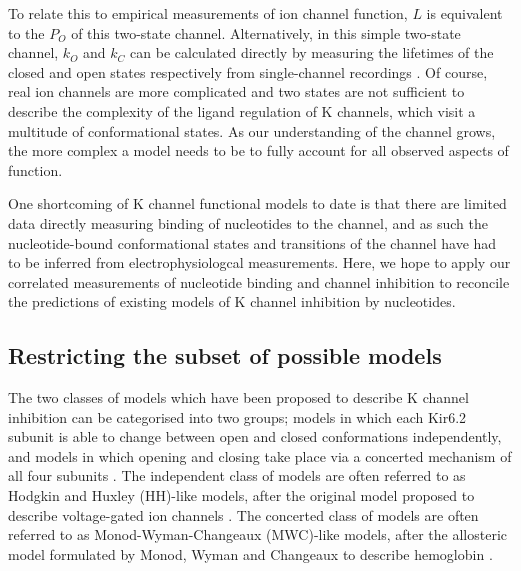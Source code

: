 To relate this to empirical measurements of ion channel function, $L$ is equivalent to the $P_O$ of this two-state channel.
Alternatively, in this simple two-state channel, $k_O$ and $k_C$ can be calculated directly by measuring the lifetimes of the closed and open states respectively from single-channel recordings \cite{reinhold_penner_auth_single-channel_1995, sivilotti_praise_2016}.
Of course, real ion channels are more complicated and two states are not sufficient to describe the complexity of the ligand regulation of K\ATP{} channels, which visit a multitude of conformational states.
As our understanding of the channel grows, the more complex a model needs to be to fully account for all observed aspects of function.

One shortcoming of K\ATP{} channel functional models to date is that there are limited data directly measuring binding of nucleotides to the channel, and as such the nucleotide-bound conformational states and transitions of the channel have had to be inferred from electrophysiologcal measurements.
Here, we hope to apply our correlated measurements of nucleotide binding and channel inhibition to reconcile the predictions of existing models of K\ATP{} channel inhibition by nucleotides.

\subsection{Restricting the subset of possible models}

The two classes of models which have been proposed to describe K\ATP{} channel inhibition can be categorised into two groups; models in which each Kir6.2 subunit is able to change between open and closed conformations independently, and models in which opening and closing take place via a concerted mechanism of all four subunits \cite{enkvetchakul_kinetic_2000-1, enkvetchakul_atp_2001, drain_concerted_2004, fang_n-terminal_2006, wang_subunit-stoichiometric_2007, craig_how_2008-1, proks_modeling_2009, vedovato_nucleotide-binding_2015}.
The independent class of models are often referred to as Hodgkin and Huxley (HH)-like models, after the original model proposed to describe voltage-gated ion channels \cite{hodgkin_quantitative_1952}.
The concerted class of models are often referred to as Monod-Wyman-Changeaux (MWC)-like models, after the allosteric model formulated by Monod, Wyman and Changeaux to describe hemoglobin \cite{monod_nature_1965}.

